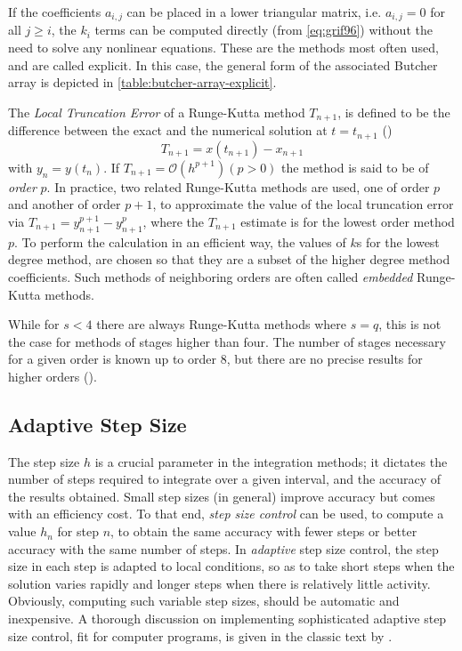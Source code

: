If the coefficients $a_{i,j}$ can be placed in a lower triangular matrix, i.e. 
$a_{i,j} = 0$ for all $j \ge i$, the $k_i$ terms can be computed directly (from 
\autoref{eq:grif96}) without the need to solve any nonlinear equations. These are 
the methods most often used, and are called explicit. In this case, the general form 
of the associated Butcher array is depicted in \autoref{table:butcher-array-explicit}.

The \emph{Local Truncation Error} of a Runge-Kutta method $T_{n+1}$, is defined 
to be the difference between the exact and the numerical solution at $t=t_{n+1}$
(\cite{Griffiths2010})
\begin{equation}
    T_{n+1} = x(t_{n+1}) - x_{n+1}
\end{equation}
with $y_n = y(t_n)$. If $T_{n+1} = \mathcal{O}(h^{p+1})(p>0)$ the method is 
said to be of \emph{order} $p$. In practice, two related Runge-Kutta methods are 
used, one of order $p$ and another of order $p+1$, to approximate the value of 
the local truncation error via $T_{n+1} = y^{p+1}_{n+1} - y^{p}_{n+1}$, where the 
$T_{n+1}$ estimate is for the lowest order method $p$. To perform the calculation 
in an efficient way, the values of $k$s for the lowest degree method, are chosen 
so that they are a subset of the higher degree method coefficients. Such methods 
of neighboring orders are often called \emph{embedded} Runge-Kutta methods.

While for $s<4$ there are always Runge-Kutta methods where $s=q$, this is not the 
case for methods of stages higher than four. The number of stages necessary for 
a given order is known up to order 8, but there are no precise results for higher 
orders (\cite{Griffiths2010}).

\subsection{Adaptive Step Size}\label{ssec:adaptive-step-size}

The step size $h$ is a crucial parameter in the integration methods; it dictates 
the number of steps required to integrate over a given interval, and the accuracy 
of the results obtained. Small step sizes (in general) improve accuracy but comes 
with an efficiency cost. To that end, \emph{step size control} can be used, to 
compute a value $h_n$ for step $n$, to obtain the same accuracy with fewer steps 
or better accuracy with the same number of steps. In \emph{adaptive} step size control,
the step size in each step is adapted to local conditions, so as to take short steps 
when the solution varies rapidly and longer steps when there is relatively little 
activity. Obviously, computing such variable step sizes, should be automatic and 
inexpensive. A thorough discussion on implementing sophisticated adaptive step size 
control, fit for computer programs, is given in the classic text by \cite{Shampine1975}.
